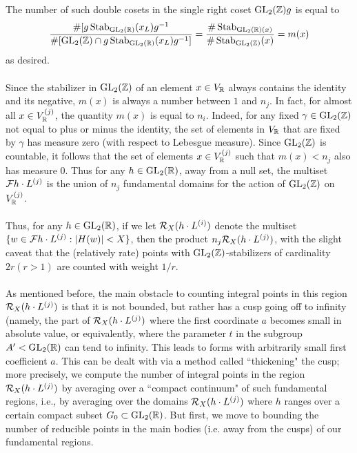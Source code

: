 \documentclass[12pt,amsfont]{amsart}
\begin{document}
The number of such double cosets in the single right coset $\operatorname{GL}_2({\mathbb Z})g$ is equal to 
\[ \frac{\# [g \operatorname{Stab}_{\operatorname{GL}_2({\mathbb R})} (x_L)g^{-1}}{\#[\operatorname{GL}_2({\mathbb Z}) \cap g \operatorname{Stab}_{\operatorname{GL}_2({\mathbb R})} (x_L)g^{-1}]} = \frac{\#\operatorname{Stab}_{\operatorname{GL}_2({\mathbb R})(x)}}{\# \operatorname{Stab}_{\operatorname{GL}_2({\mathbb Z})}(x)} = m(x)\]
as desired. \\ \\
Since the stabilizer in $\operatorname{GL}_2({\mathbb Z})$ of an element $x \in V_{\mathbb R}$ always contains the identity and its negative, $m(x)$ is always a number between $1$ and $n_j$. In fact, for almost all $x \in V_{\mathbb R}^{(j)}$, the quantity $m(x)$ is equal to $n_i$. Indeed, for any fixed $\gamma \in \operatorname{GL}_2({\mathbb Z})$ not equal to plus or minus the identity, the set of elements in $V_{\mathbb R}$ that are fixed by $\gamma$ has measure zero (with respect to Lebesgue measure). Since $\operatorname{GL}_2({\mathbb Z})$ is countable, it follows that the set of elements $x \in V_{{\mathbb R}}^{(j)}$ such that $m(x) < n_j$ also has measure $0$. Thus for any $h \in \operatorname{GL}_2({\mathbb R})$, away from a null set, the multiset $\mathcal{F} h \cdot L^{(j)}$ is the union of $n_j$ fundamental domains for the action of $\operatorname{GL}_2({\mathbb Z})$ on $V_{{\mathbb R}}^{(j)}$. \\ \\
Thus, for any $h \in \operatorname{GL}_2({\mathbb R})$, if we let $\mathcal{R}_X(h \cdot L^{(i)})$ denote the multiset $\{w \in \mathcal{F} h \cdot L^{(j)} : |H(w)| < X\}$, then the product $n_j \mathcal{R}_X(h \cdot L^{(j)})$, with the slight caveat that the (relatively rate) points with $\operatorname{GL}_2({\mathbb Z})$-stabilizers of cardinality $2r (r > 1)$ are counted with weight $1/r$. \\ \\
As mentioned before, the main obstacle to counting integral points in this region $\mathcal{R}_X(h \cdot L^{(j)})$ is that it is not bounded, but rather has a cusp going off to infinity (namely, the part of $\mathcal{R}_X(h \cdot L^{(j)})$ where the first coordinate $a$ becomes small in absolute value, or equivalently, where the parameter $t$ in the subgroup $A' < \operatorname{GL}_2({\mathbb R})$ can tend to infinity. This leads to forms with arbitrarily small first coefficient $a$. This can be dealt with via a method called ``thickening" the cusp; more precisely, we compute the number of integral points in the region $\mathcal{R}_X(h \cdot L^{(j)})$ by averaging over a ``compact continuum" of such fundamental regions, i.e., by averaging over the domains $\mathcal{R}_X(h \cdot L^{(j)})$ where $h$ ranges over a certain compact subset $G_0 \subset \operatorname{GL}_2({\mathbb R})$. But first, we move to bounding the number of reducible points in the main bodies (i.e. away from the cusps) of our fundamental regions. \\ \\
\end{document}
